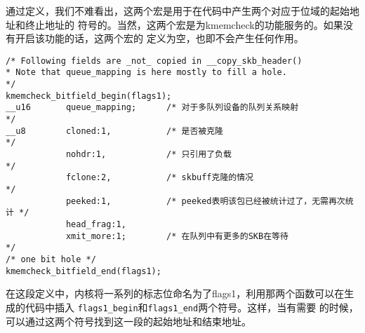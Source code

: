 通过定义，我们不难看出，这两个宏是用于在代码中产生两个对应于位域的起始地址和终止地址的
符号的。当然，这两个宏是为kmemcheck的功能服务的。如果没有开启该功能的话，这两个宏的
定义为空，也即不会产生任何作用。
\begin{verbatim}
/* Following fields are _not_ copied in __copy_skb_header()
* Note that queue_mapping is here mostly to fill a hole.
*/
kmemcheck_bitfield_begin(flags1);
__u16       queue_mapping; 		/* 对于多队列设备的队列关系映射 				*/
__u8        cloned:1, 			/* 是否被克隆 								*/
            nohdr:1, 			/* 只引用了负载 								*/
            fclone:2, 			/* skbuff克隆的情况 							*/
            peeked:1,			/* peeked表明该包已经被统计过了，无需再次统计 */
            head_frag:1,
            xmit_more:1; 		/* 在队列中有更多的SKB在等待 					*/
/* one bit hole */
kmemcheck_bitfield_end(flags1);
\end{verbatim}

在这段定义中，内核将一系列的标志位命名为了flags1，利用那两个函数可以在生成的代码中插入
\texttt{flags1_begin}和\texttt{flags1_end}两个符号。这样，当有需要
的时候，可以通过这两个符号找到这一段的起始地址和结束地址。

